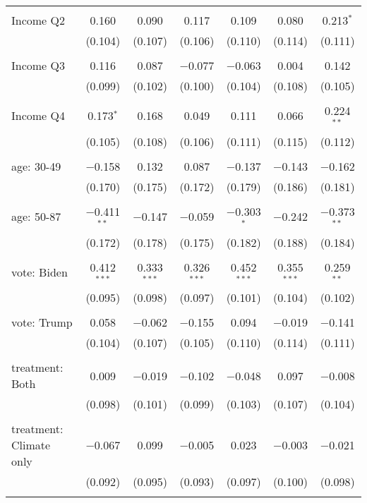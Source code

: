 \begin{tabular}{@{\extracolsep{5pt}}lcccccc}
  & & & & & & \\ 
 Income Q2 & 0.160 & 0.090 & 0.117 & 0.109 & 0.080 & 0.213$^{*}$ \\ 
  & (0.104) & (0.107) & (0.106) & (0.110) & (0.114) & (0.111) \\ 
  & & & & & & \\ 
 Income Q3 & 0.116 & 0.087 & $-$0.077 & $-$0.063 & 0.004 & 0.142 \\ 
  & (0.099) & (0.102) & (0.100) & (0.104) & (0.108) & (0.105) \\ 
  & & & & & & \\ 
 Income Q4 & 0.173$^{*}$ & 0.168 & 0.049 & 0.111 & 0.066 & 0.224$^{**}$ \\ 
  & (0.105) & (0.108) & (0.106) & (0.111) & (0.115) & (0.112) \\ 
  & & & & & & \\ 
 age: 30-49 & $-$0.158 & 0.132 & 0.087 & $-$0.137 & $-$0.143 & $-$0.162 \\ 
  & (0.170) & (0.175) & (0.172) & (0.179) & (0.186) & (0.181) \\ 
  & & & & & & \\ 
 age: 50-87 & $-$0.411$^{**}$ & $-$0.147 & $-$0.059 & $-$0.303$^{*}$ & $-$0.242 & $-$0.373$^{**}$ \\ 
  & (0.172) & (0.178) & (0.175) & (0.182) & (0.188) & (0.184) \\ 
  & & & & & & \\ 
 vote: Biden & 0.412$^{***}$ & 0.333$^{***}$ & 0.326$^{***}$ & 0.452$^{***}$ & 0.355$^{***}$ & 0.259$^{**}$ \\ 
  & (0.095) & (0.098) & (0.097) & (0.101) & (0.104) & (0.102) \\ 
  & & & & & & \\ 
 vote: Trump & 0.058 & $-$0.062 & $-$0.155 & 0.094 & $-$0.019 & $-$0.141 \\ 
  & (0.104) & (0.107) & (0.105) & (0.110) & (0.114) & (0.111) \\ 
  & & & & & & \\ 
 treatment: Both & 0.009 & $-$0.019 & $-$0.102 & $-$0.048 & 0.097 & $-$0.008 \\ 
  & (0.098) & (0.101) & (0.099) & (0.103) & (0.107) & (0.104) \\ 
  & & & & & & \\ 
 treatment: Climate only & $-$0.067 & 0.099 & $-$0.005 & 0.023 & $-$0.003 & $-$0.021 \\ 
  & (0.092) & (0.095) & (0.093) & (0.097) & (0.100) & (0.098) \\ 
  & & & & & & \\ 

\end{tabular}
